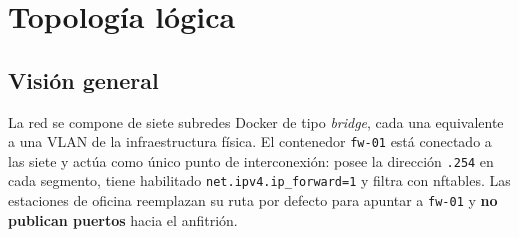 \documentclass[11pt,a4paper,oneside]{report}
\newcommand{\cod}[1]{\texttt{\small #1}}
\begin{document}
\chapter{Topología lógica}

\section{Visión general}

La red se compone de siete subredes Docker de tipo \emph{bridge}, cada una equivalente a
una VLAN de la infraestructura física. El contenedor \cod{fw-01} está conectado a las
siete y actúa como único punto de interconexión: posee la dirección \cod{.254} en cada
segmento, tiene habilitado \cod{net.ipv4.ip\_forward=1} y filtra con nftables. Las
estaciones de oficina reemplazan su ruta por defecto para apuntar a \cod{fw-01} y
\textbf{no publican puertos} hacia el anfitrión.
\end{document}

